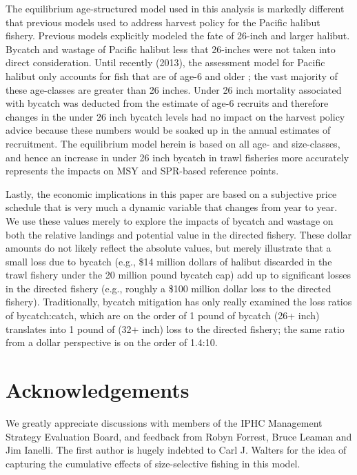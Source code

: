 \documentclass[12pt,leqno]{article}
\begin{document}
The equilibrium age-structured model used in this analysis is markedly different that previous models used to address harvest policy for the Pacific halibut fishery.  Previous models explicitly modeled the fate of 26-inch and larger halibut.  Bycatch and wastage of Pacific halibut less that 26-inches were not taken into direct consideration.  Until recently (2013), the assessment model for Pacific halibut only accounts for fish that are of age-6 and older \cite{clark2006assessment}; the vast majority of these age-classes are greater than 26 inches. Under 26 inch mortality associated with bycatch was deducted from the estimate of age-6 recruits and therefore changes in the under 26 inch bycatch levels had no impact on the harvest policy advice because these numbers would be soaked up in the annual estimates of recruitment.  The equilibrium model herein is based on all age- and size-classes, and hence an increase in under 26 inch bycatch in trawl fisheries more accurately represents the impacts on MSY and SPR-based reference points.

Lastly, the economic implications in this paper are based on a subjective price schedule that is very much a dynamic variable that changes from year to year.  We use these values merely to explore the impacts of bycatch and wastage on both the relative landings and potential value in the directed fishery.  These dollar amounts do not likely reflect the absolute values, but merely illustrate that a small loss due to bycatch (e.g., \$14 million dollars of halibut discarded in the trawl fishery under the 20 million pound bycatch cap) add up to significant losses in the directed fishery (e.g., roughly a \$100 million dollar loss to the directed fishery).  Traditionally, bycatch mitigation has only really examined the loss ratios of bycatch:catch, which are on the order of 1 pound of bycatch (26+ inch) translates into 1 pound of (32+ inch) loss to the directed fishery; the same ratio from a dollar perspective is on the order of 1.4:10.

\section*{Acknowledgements}

We greatly appreciate discussions with members of the IPHC Management Strategy Evaluation Board, and feedback from Robyn Forrest, Bruce Leaman and Jim Ianelli. The first author is hugely indebted to Carl J. Walters for the idea of capturing the cumulative effects of size-selective fishing in this model.





\appendix
% 
%
\end{document}
